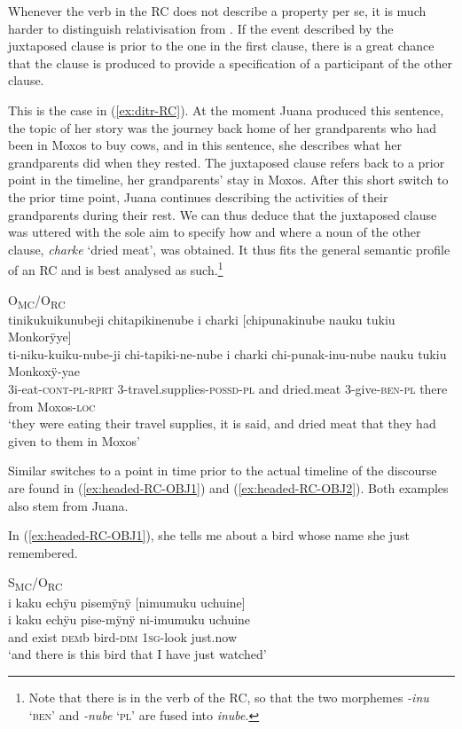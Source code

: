 Whenever the verb in the RC does not describe a property per se, it is much harder to distinguish relativisation from . If the event described by the juxtaposed clause is prior to the one in the first clause, there is a great chance that the clause is produced to provide a specification of a participant of the other clause.

This is the case in (\ref{ex:ditr-RC}). At the moment Juana produced this sentence, the topic of her story was the journey back home of her grandparents who had been in Moxos to buy cows, and in this sentence, she describes what her grandparents did when they rested. The juxtaposed clause refers back to a prior point in the timeline, her grandparents’ stay in Moxos. After this short switch to the prior time point, Juana continues describing the activities of their grandparents during their rest. We can thus deduce that the juxtaposed clause was uttered with the sole aim to specify how and where a noun of the other clause, \textit{charke} ‘dried meat’, was obtained. It thus fits the general semantic profile of an RC and is best analysed as such.\footnote{Note that there is  in the verb of the RC, so that the two morphemes \textit{-inu} ‘\textsc{ben}’ and \textit{-nube} ‘\textsc{pl}’ are fused into \textit{inube}.}

\ea\label{ex:ditr-RC}
\begingl
\glpreamble \textup{O\textsubscript{MC}/O\textsubscript{RC}}\\tinikukuikunubeji chitapikinenube i charki \textup{[}chipunakinube nauku tukiu Monkorÿye\textup{]}\\
\gla ti-niku-kuiku-nube-ji chi-tapiki-ne-nube i charki chi-punak-inu-nube nauku tukiu Monkoxÿ-yae\\
\glb 3i-eat-\textsc{cont}-\textsc{pl}-\textsc{rprt} 3-travel.supplies-\textsc{possd}-\textsc{pl} and dried.meat 3-give-\textsc{ben}-\textsc{pl} there from Moxos-\textsc{loc}\\
\glft ‘they were eating their travel supplies, it is said, and dried meat that they had given to them in Moxos’
\endgl
\trailingcitation{[jxx-p151016l-2.174]}
\xe

Similar switches to a point in time prior to the actual timeline of the discourse are found in (\ref{ex:headed-RC-OBJ1}) and (\ref{ex:headed-RC-OBJ2}). Both examples also stem from Juana.

In (\ref{ex:headed-RC-OBJ1}), she tells me about a bird whose name she just remembered.

\newpage
\ea\label{ex:headed-RC-OBJ1}
\begingl
\glpreamble \textup{S\textsubscript{MC}/O\textsubscript{RC}}\\i kaku echÿu pisemÿnÿ \textup{[}nimumuku uchuine\textup{]}\\
\gla i kaku echÿu pise-mÿnÿ ni-imumuku uchuine\\
\glb and exist \textsc{dem}b bird-\textsc{dim} 1\textsc{sg}-look just.now\\
\glft ‘and there is this bird that I have just watched’
\endgl
\trailingcitation{[jxx-p120430l-1.100]}
\xe

